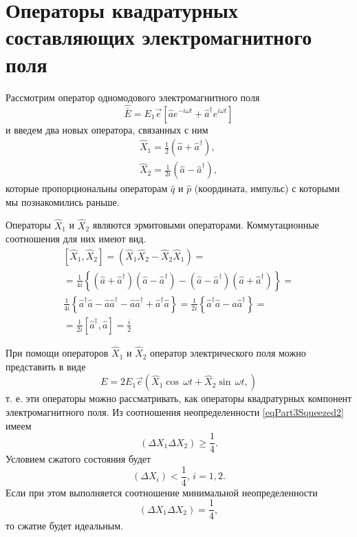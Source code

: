 \section{Операторы квадратурных составляющих электромагнитного
  поля}
Рассмотрим оператор одномодового электромагнитного поля 
\begin{equation}
\hat{\bar{E}} = 
E_1 \vec{e}\left[
\hat{a} e^{-i\omega t} +
\hat{a}^{\dag} e^{i\omega t}
\right]
\nonumber
\end{equation}
и введем два новых оператора, связанных с ним
\begin{eqnarray}
\hat{X}_1 = \frac{1}{2}\left(\hat{a} + \hat{a}^{\dag}\right),
\nonumber \\
\hat{X}_2 = \frac{1}{2i}\left(\hat{a} - \hat{a}^{\dag}\right),
\nonumber
\end{eqnarray}
которые пропорциональны операторам $\hat{q}$ и $\hat{p}$ (координата,
импульс) с которыми мы познакомились раньше.

Операторы $\hat{X}_1$ и $\hat{X}_2$ являются эрмитовыми
операторами. Коммутационные соотношения для них имеют вид.
\begin{eqnarray}
\left[\hat{X}_1, \hat{X}_2\right] = 
\left(\hat{X}_1 \hat{X}_2 - \hat{X}_2 \hat{X}_1 \right) = 
\nonumber \\
=
\frac{1}{4i}
\left\{
\left(\hat{a} + \hat{a}^{\dag}\right)
\left(\hat{a} - \hat{a}^{\dag}\right)
-
\left(\hat{a} - \hat{a}^{\dag}\right)
\left(\hat{a} + \hat{a}^{\dag}\right)
\right\} = 
\nonumber \\
\frac{1}{4i}
\left\{
\hat{a}^{\dag}\hat{a}
- \hat{a}\hat{a}^{\dag}
- \hat{a}\hat{a}^{\dag}
+
\hat{a}^{\dag}\hat{a}
\right\} = 
\frac{1}{2i}
\left\{
\hat{a}^{\dag}\hat{a}
- \hat{a}\hat{a}^{\dag}
\right\} =
\nonumber \\
= 
\frac{1}{2i}
\left[\hat{a}^{\dag}, \hat{a}\right] = 
\frac{i}{2}
\nonumber
\end{eqnarray}

При помощи операторов $\hat{X}_1$ и $\hat{X}_2$ оператор
электрического поля можно представить в виде
\begin{equation}
E = 2 E_1 \vec{e}\left(
\hat{X}_1 \cos \, \omega t +
\hat{X}_2 \sin \, \omega t,
\right)
\nonumber
\end{equation}
т. е. эти операторы можно рассматривать, как операторы квадратурных
компонент электромагнитного поля. Из соотношения неопределенности
\eqref{eqPart3Squeezed2} имеем
\begin{equation}
\left(
\Delta X_1 \Delta X_2
\right) \ge \frac{1}{4}.
\nonumber
\end{equation}
Условием сжатого состояния будет
\begin{equation}
\left(
\Delta X_i 
\right) < \frac{1}{4}, \, i = 1,2.
\nonumber
\end{equation}
Если при этом выполняется соотношение минимальной неопределенности
\begin{equation}
\left(
\Delta X_1 \Delta X_2
\right) = \frac{1}{4},
\nonumber
\end{equation}
то сжатие будет идеальным.

